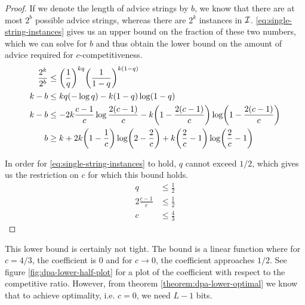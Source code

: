 \begin{proof}
    If we denote the length of advice strings by $b$, we know that there
    are at most $2^b$ possible advice strings, whereas there are $2^k$
    instances in $\mathcal{I}$. \eqref{eq:single-string-instances} gives us an
    upper bound on the fraction of these two numbers, which we can solve
    for $b$ and thus obtain the lower bound on the amount of advice
    required for $c$-competitiveness.
    \begin{align*}
        \frac{2^k}{2^b} &\leq \paren*{\frac{1}{q}}^{kq}
            \paren*{\frac{1}{1-q}}^{k(1-q)} \\
        k-b &\leq kq(-\log{}q) - k(1-q)\log(1-q) \\
        k-b &\leq -2k\frac{c-1}{c}\log\frac{2(c-1)}{c} -
            k\paren*{1-\frac{2(c-1)}{c}} \log\paren*{1-\frac{2(c-1)}{c}} \\
        b &\geq k + 2k\paren*{1-\frac{1}{c}}\log\paren*{2-\frac{2}{c}}
            + k\paren*{\frac{2}{c}-1}\log\paren*{\frac{2}{c}-1}
    \end{align*}

    In order for \eqref{eq:single-string-instances} to hold, $q$ cannot
    exceed $1/2$, which gives us the restriction on $c$ for which this
    bound holds.
    \begin{align*}
        q &\leq \frac{1}{2} \\
        2\frac{c-1}{c} &\leq \frac{1}{2} \\
        c &\leq \frac{4}{3}
    \end{align*}
\end{proof}

This lower bound is certainly not tight. The bound is a linear function
where for $c=4/3$, the coefficient is $0$ and for $c \to 0$, the
coefficient approaches $1/2$. See figure \ref{fig:dpa-lower-half-plot} for
a plot of the coefficient with respect to the competitive ratio. However,
from theorem \ref{theorem:dpa-lower-optimal} we know that to achieve
optimality, i.e. $c = 0$, we need $L-1$ bits.

